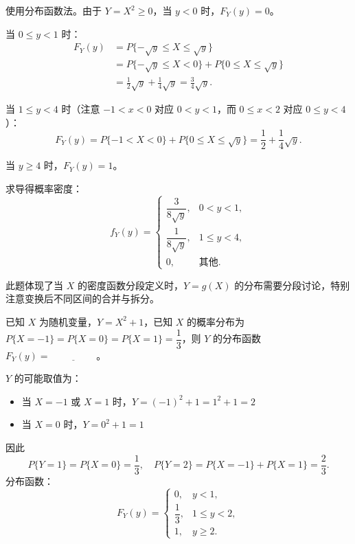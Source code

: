 \documentclass[lang=cn,11pt]{elegantbook}
\begin{document}
\begin{solution}
使用分布函数法。由于 $Y = X^2 \ge 0$，当 $y < 0$ 时，$F_Y(y) = 0$。

当 $0 \le y < 1$ 时：
\[
\begin{aligned}
F_Y(y) &= P\{-\sqrt{y} \le X \le \sqrt{y}\} \\
&= P\{-\sqrt{y} \le X < 0\} + P\{0 \le X \le \sqrt{y}\} \\
&= \frac{1}{2}\sqrt{y} + \frac{1}{4}\sqrt{y} = \frac{3}{4}\sqrt{y}.
\end{aligned}
\]

当 $1 \le y < 4$ 时（注意 $-1 < x < 0$ 对应 $0 < y < 1$，而 $0 \le x < 2$ 对应 $0 \le y < 4$）：
\[
F_Y(y) = P\{-1 < X < 0\} + P\{0 \le X \le \sqrt{y}\} = \frac{1}{2} + \frac{1}{4}\sqrt{y}.
\]

当 $y \ge 4$ 时，$F_Y(y) = 1$。

求导得概率密度：
\[
f_Y(y) = \begin{cases}
\dfrac{3}{8\sqrt{y}}, & 0 < y < 1, \\[6pt]
\dfrac{1}{8\sqrt{y}}, & 1 \le y < 4, \\[6pt]
0, & \text{其他}.
\end{cases}
\]

此题体现了当 $X$ 的密度函数分段定义时，$Y = g(X)$ 的分布需要分段讨论，特别注意变换后不同区间的合并与拆分。
\end{solution}


\begin{exercise}[离散型随机变量函数分布] \label{exer:2-43}
已知 $X$ 为随机变量，$Y=X^2+1$，已知 $X$ 的概率分布为 $P\{X=-1\}=P\{X=0\}=P\{X=1\}=\dfrac{1}{3}$，则 $Y$ 的分布函数 $F_Y(y)=\underline{\hspace{2cm}}$。
\end{exercise}
\begin{solution}
$Y$ 的可能取值为：
\begin{itemize}
    \item 当 $X=-1$ 或 $X=1$ 时，$Y=(-1)^2+1=1^2+1=2$
    \item 当 $X=0$ 时，$Y=0^2+1=1$
\end{itemize}
因此
\[
P\{Y=1\}=P\{X=0\}=\frac{1}{3}, \quad P\{Y=2\}=P\{X=-1\}+P\{X=1\}=\frac{2}{3}.
\]
分布函数：
\[
F_Y(y)=
\begin{cases}
0, & y<1, \\[6pt]
\dfrac{1}{3}, & 1\leqslant y<2, \\[6pt]
1, & y\geqslant2.
\end{cases}
\]
\end{solution}
\end{document}
